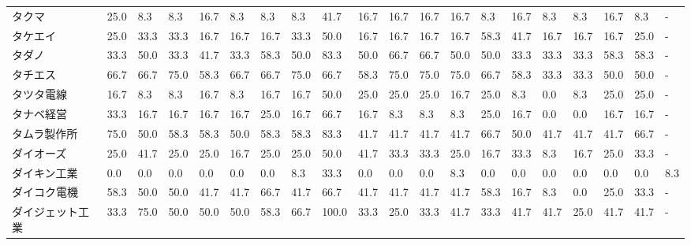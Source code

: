 \documentclass[a4paper，11pt]{jsarticle}
\begin{document}
\begin{longtable}[c]{lp{3mm}p{3mm}p{3mm}p{3mm}p{3mm}p{3mm}p{3mm}p{3mm}p{3mm}p{3mm}p{3mm}p{3mm}p{3mm}p{3mm}p{3mm}p{3mm}p{3mm}p{3mm}p{3mm}}
タクマ             &   25.0 &    8.3 &       8.3 &      16.7 &        8.3 &    8.3 &    8.3 &   41.7 &    16.7 &    16.7 &   16.7 &  16.7 &    8.3 &    16.7 &     8.3 &   8.3 &  16.7 &   8.3 &     - \\
タケエイ            &   25.0 &   33.3 &      33.3 &      16.7 &       16.7 &   16.7 &   33.3 &   50.0 &    16.7 &    16.7 &   16.7 &  16.7 &   58.3 &    41.7 &    16.7 &  16.7 &  16.7 &  25.0 &     - \\
タダノ             &   33.3 &   50.0 &      33.3 &      41.7 &       33.3 &   58.3 &   50.0 &   83.3 &    50.0 &    66.7 &   66.7 &  50.0 &   50.0 &    33.3 &    33.3 &  33.3 &  58.3 &  58.3 &     - \\
タチエス            &   66.7 &   66.7 &      75.0 &      58.3 &       66.7 &   66.7 &   75.0 &   66.7 &    58.3 &    75.0 &   75.0 &  75.0 &   66.7 &    58.3 &    33.3 &  33.3 &  50.0 &  50.0 &     - \\
タツタ電線           &   16.7 &    8.3 &       8.3 &      16.7 &        8.3 &   16.7 &   16.7 &   50.0 &    25.0 &    25.0 &   25.0 &  16.7 &   25.0 &     8.3 &     0.0 &   8.3 &  25.0 &  25.0 &     - \\
タナベ経営           &   33.3 &   16.7 &      16.7 &      16.7 &       16.7 &   25.0 &   16.7 &   66.7 &    16.7 &     8.3 &    8.3 &   8.3 &   25.0 &    16.7 &     0.0 &   0.0 &  16.7 &  16.7 &     - \\
タムラ製作所          &   75.0 &   50.0 &      58.3 &      58.3 &       50.0 &   58.3 &   58.3 &   83.3 &    41.7 &    41.7 &   41.7 &  41.7 &   66.7 &    50.0 &    41.7 &  41.7 &  41.7 &  66.7 &     - \\
ダイオーズ           &   25.0 &   41.7 &      25.0 &      25.0 &       16.7 &   25.0 &   25.0 &   50.0 &    41.7 &    33.3 &   33.3 &  25.0 &   16.7 &    33.3 &     8.3 &  16.7 &  25.0 &  33.3 &     - \\
ダイキン工業          &    0.0 &    0.0 &       0.0 &       0.0 &        0.0 &    0.0 &    8.3 &   33.3 &     0.0 &     0.0 &    0.0 &   8.3 &    0.0 &     0.0 &     0.0 &   0.0 &   0.0 &   0.0 &   8.3 \\
ダイコク電機          &   58.3 &   50.0 &      50.0 &      41.7 &       41.7 &   66.7 &   41.7 &   66.7 &    41.7 &    41.7 &   41.7 &  41.7 &   58.3 &    16.7 &     8.3 &   0.0 &  25.0 &  33.3 &     - \\
ダイジェット工業        &   33.3 &   75.0 &      50.0 &      50.0 &       50.0 &   58.3 &   66.7 &  100.0 &    33.3 &    25.0 &   33.3 &  41.7 &   33.3 &    41.7 &    41.7 &  25.0 &  41.7 &  41.7 &     - \\

\end{longtable}
\end{document}
